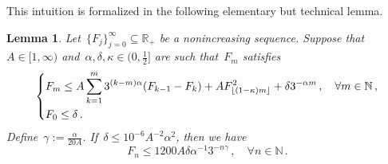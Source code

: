 \documentclass[11pt,twoside]{article} %
\numberwithin{equation}{section}
\newtheorem{lemma}[theorem]{Lemma}
\theoremstyle{definition}
\let\originalleft\left
\let\originalright\right
\renewcommand{\left}{\mathopen{}\mathclose\bgroup\originalleft}
\renewcommand{\right}{\aftergroup\egroup\originalright}
\newcommand*{\N}{\ensuremath{\mathbb{N}}}
\newcommand*{\R}{\ensuremath{\mathbb{R}}}
\begin{document}
\smallskip

This intuition is formalized in the following elementary but technical lemma. 

\begin{lemma} 
\label{l.iteration}
Let~$\{ F_j \}_{j=0}^\infty\subseteq\R_+$  be a nonincreasing sequence. 
Suppose that~$A \in [1,\infty)$ and~$\alpha,\delta,\kappa \in (0,\tfrac12]$ are such that~$F_m$ satisfies
\begin{equation}
\label{e.Fiter.ass}
\left\{
\begin{aligned}
& F_m \leq A \sum_{k=1}^m 3^{(k-m)\alpha} (F_{k-1} - F_k)  
+  
A F_{\lfloor (1-\kappa) m \rfloor}^2   
+   
\delta 3^{-\alpha m} 
\,, \quad \forall m \in\N\,, 
\\ & 
F_0 \leq \delta 
\,.
\end{aligned}
\right.
\end{equation}
Define~$\gamma := \frac{\alpha}{20A}$. 
If~$\delta \leq 10^{-6} A^{-2} \alpha^2$, then we have
\begin{equation}
\label{e.Fiter.res}
F_n \leq  1200A \delta \alpha^{-1}  3^{-n\gamma}
\,, \quad \forall n\in\N
\,.
\end{equation}
\end{lemma}
\end{document}
